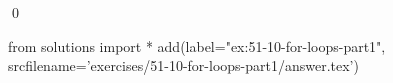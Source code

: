 
\begin{ex}
  \label{ex:51-10-for-loops-part1}
  
  \qed
\end{ex}
\begin{python0}
from solutions import *
add(label="ex:51-10-for-loops-part1",
    srcfilename='exercises/51-10-for-loops-part1/answer.tex')
\end{python0}
